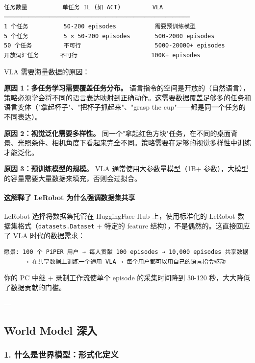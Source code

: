 \documentclass[UTF8,a4paper,11pt]{ctexart}
\begin{document}
\begin{lstlisting}[language=text]
任务数量          单任务 IL (如 ACT)         VLA
─────────────────────────────────────────────────────
1 个任务          50-200 episodes           需要预训练模型
5 个任务          5 × 50-200 episodes       500-2000 episodes
50 个任务         不可行                     5000-20000+ episodes
开放词汇任务      不可行                     100K+ episodes
\end{lstlisting}

VLA 需要海量数据的原因：

\textbf{原因 1：多任务学习需要覆盖任务分布。} 语言指令的空间是开放的（自然语言），策略必须学会将不同的语言表达映射到正确动作。这需要数据覆盖足够多的任务和语言变体（"拿起杯子"、"把杯子抓起来"、"grasp the cup"——都是同一个任务的不同表达）。

\textbf{原因 2：视觉泛化需要多样性。} 同一个"拿起红色方块"任务，在不同的桌面背景、光照条件、相机角度下看起来完全不同。策略需要在足够的视觉多样性中训练才能泛化。

\textbf{原因 3：预训练模型的规模。} VLA 通常使用大参数量模型（1B+ 参数），大模型的容量需要大量数据来填充，否则会过拟合。

\paragraph{这解释了 LeRobot 为什么强调数据集共享}


LeRobot 选择将数据集托管在 HuggingFace Hub 上，使用标准化的 LeRobot 数据集格式（\texttt{datasets.Dataset} + 特定的 feature 结构），不是偶然的。这直接回应了 VLA 时代的数据需求：

\begin{lstlisting}[language=text]
愿景: 100 个 PiPER 用户 → 每人贡献 100 episodes → 10,000 episodes 共享数据
      → 在共享数据上训练一个通用 VLA → 每个用户都可以用自己的语言指令驱动
\end{lstlisting}

你的 PC 中继 + 录制工作流使单个 episode 的采集时间降到 30-120 秒，大大降低了数据贡献的门槛。

---

\subsection{World Model 深入}

\subsubsection{1. 什么是世界模型：形式化定义}
\end{document}
